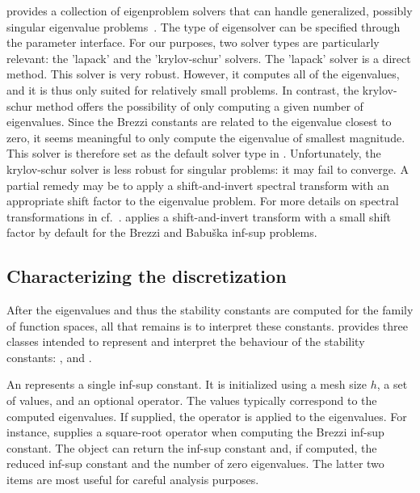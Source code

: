 \slepc{} provides a collection of eigenproblem solvers that can handle
generalized, possibly singular eigenvalue
problems~\cite{HernandezRomanEtAl2005, slepc_users_manual}. The type
of eigensolver can be specified through the \dolfin{} parameter
interface. For our purposes, two solver types are particularly
relevant: the 'lapack' and the 'krylov-schur' solvers.  The 'lapack'
solver is a direct method. This solver is very robust. However, it
computes all of the eigenvalues, and it is thus only suited for
relatively small problems. In contrast, the krylov-schur method offers
the possibility of only computing a given number of eigenvalues. Since
the Brezzi constants are related to the eigenvalue closest to zero, it
seems meaningful to only compute the eigenvalue of smallest
magnitude. This solver is therefore set as the default solver type in
\rognesascot. Unfortunately, the krylov-schur solver is less robust
for singular problems: it may fail to converge. A partial remedy may
be to apply a shift-and-invert spectral transform with an appropriate
shift factor to the eigenvalue problem. For more details on spectral
transformations in \slepc{}
cf.~\cite{slepc_users_manual}. \rognesascot{} applies a
shift-and-invert transform with a small shift factor by default for
the Brezzi and Babu\v ska inf-sup problems.

\subsection{Characterizing the discretization}

After the eigenvalues and thus the stability constants are computed
for the family of function spaces, all that remains is to interpret
these constants. \rognesascot{} provides three classes intended to represent
and interpret the behaviour of the stability constants:
,  and
.

An  represents a single inf-sup
constant. It is initialized using a mesh size $h$, a set of values,
and an optional operator. The values typically correspond to the
computed eigenvalues. If supplied, the operator is applied to the
eigenvalues.  For instance, \rognesascot{} supplies a square-root operator
when computing the Brezzi inf-sup constant. The object can return the
inf-sup constant and, if computed, the reduced inf-sup constant and
the number of zero eigenvalues. The latter two items are most useful
for careful analysis purposes.

